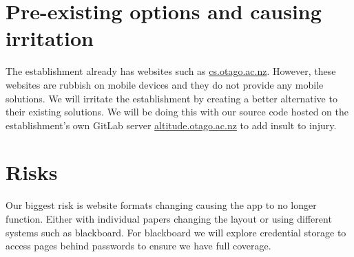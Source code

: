 \documentclass{article}
\begin{document}
	\section{Pre-existing options and causing irritation}
	
	The establishment already has websites such as \url{cs.otago.ac.nz}. However, these websites are rubbish on mobile devices and they do not provide any mobile solutions. We will irritate the establishment by creating a better alternative to their existing solutions. We will be doing this with our source code hosted on the establishment's own GitLab server \url{altitude.otago.ac.nz} to add insult to injury.
	
	\section{Risks}
	
	Our biggest risk is website formats changing causing the app to no longer function. Either with individual papers changing the layout or using different systems such as blackboard. For blackboard we will explore credential storage to access pages behind passwords to ensure we have full coverage.
\end{document}
